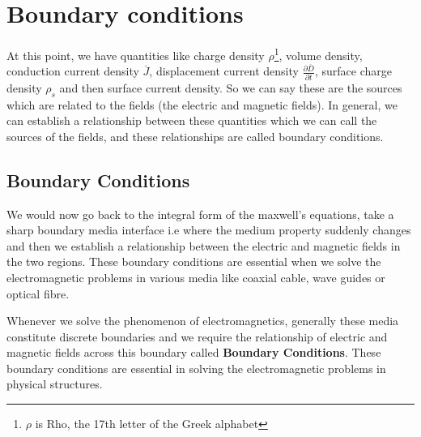 \chapter{Boundary conditions}\label{lec:lec20}

At this point, we have quantities like charge density $\rho$\footnote[1]{$\rho$ is Rho, the 17th letter of the Greek alphabet}, volume density, conduction current density $\overline{J}$, displacement current density $\frac{\partial \overline{D}}{\partial t}$, surface charge density $\rho_s$ and then surface current density. So we can say these are the sources which are related to the fields (the electric and magnetic fields). In general, we can establish a relationship between these quantities which we can call the sources of the fields, and these relationships are called boundary conditions.

\section{Boundary Conditions}

We would now go back to the integral form of the maxwell's equations, take a sharp boundary media interface i.e where the medium property suddenly changes and then we establish a relationship between the electric and magnetic fields in the two regions. These boundary conditions are essential when we solve the electromagnetic problems in various media like coaxial cable, wave guides or optical fibre.

Whenever we solve the phenomenon of electromagnetics, generally these media constitute discrete boundaries and we require the relationship of electric and magnetic fields across this boundary called \textbf{Boundary Conditions}. These boundary conditions are essential in solving the electromagnetic problems in physical structures.

